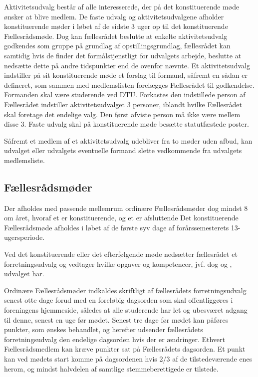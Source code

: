 \begin{list}
\begin{list}
\item Aktivitetsudvalg består af alle interesserede, der på det konstituerende møde ønsker at blive medlem. De faste udvalg og aktivitetsudvalgene afholder konstituerende møder i løbet af de sidste 3 uger op til det konstituerende Fællesrådsmøde. Dog kan fællesrådet beslutte at enkelte aktivitetsudvalg godkendes som gruppe på grundlag af opstillingsgrundlag, fællesrådet kan samtidig hvis de finder det formålstjenstligt for udvalgets arbejde, beslutte at nedsætte dette på andre tidspunkter end de ovenfor nævnte. Et aktivitetsudvalg indstiller på sit konstituerende møde et forslag til formand, såfremt en sådan er defineret, som sammen med medlemslisten forelægges Fællesrådet til godkendelse. Formanden skal være studerende ved DTU. Forkastes den indstillede person af Fællesrådet indstiller aktivitetsudvalget 3 personer, iblandt hvilke Fællesrådet skal foretage det endelige valg. Den først afviste person må ikke være mellem disse 3. Faste udvalg skal på konstituerende møde besætte statutfæstede poster.

\item  Såfremt et medlem af et aktivitetsudvalg udebliver fra to møder uden afbud, kan udvalget eller udvalgets eventuelle formand slette vedkommende fra udvalgets medlemsliste.


\subsection{Fællesrådsmøder}
\label{S:kap:FRmoeder}
\item Der afholdes med passende mellemrum ordinære Fællesrådsmøder dog mindst 8 om året, hvoraf et er konstituerende, og et er afsluttende Det konstituerende Fællesrådsmøde afholdes i løbet af de første syv dage af forårssemesterets 13-ugersperiode.

\item  Ved det konstituerende eller det efterfølgende møde nedsætter fællesrådet et forretningsudvalg og vedtager hvilke opgaver og kompetencer, jvf. dog  og , udvalget har.

\item  \label{S:FRmoeder:indkaldelse} Ordinære Fællesrådsmøder indkaldes skriftligt af fællesrådets forretningsudvalg senest otte dage forud med en foreløbig dagsorden som skal offentliggøres i foreningens hjemmeside, således at alle studerende har let og ubesværet adgang til denne, senest en uge før mødet. Senest tre dage før mødet kan påføres punkter, som ønskes behandlet, og herefter udsender fællesrådets forretningsudvalg den endelige dagsorden hvis der er ændringer. Ethvert Fællesrådsmedlem kan kræve punkter sat på Fællesrådets dagsorden. Et punkt kan ved mødets start komme på dagsordenen hvis 2/3 af de tilstedeværende enes herom, og mindst halvdelen af samtlige stemmeberettigede er tilstede.                                     
                             

\end{list}
\end{list}
